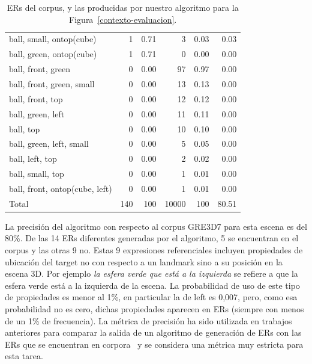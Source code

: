 \begin{table}[h]
\begin{small}
\begin{center}
\begin{tabular}{|l|r|r|r|r|r|}
ball, small, ontop(cube)                       &  1 &  0.71 &    3 &  0.03 &  0.03 \\
ball, green, ontop(cube)                       &  1 &  0.71 &    0 &  0.00 &  0.00\\
ball, front, green                              &  0 &  0.00 &   97 &  0.97 &  0.00\\
ball, front, green, small                        &  0 &  0.00 &   13 &  0.13 &  0.00\\
ball, front, top                                &  0 &  0.00 &   12 &  0.12 &  0.00\\
ball, green, left	                              &  0 &  0.00 &   11 &  0.11 &  0.00\\
ball, top                                      &  0 &  0.00 &   10 &  0.10 &  0.00\\
ball, green, left, small                         &  0 &  0.00 &    5 &  0.05 &  0.00\\
ball, left, top                                 &  0 &  0.00 &    2 &  0.02 &  0.00\\
ball, small, top                                &  0 &  0.00 &    1 &  0.01 &  0.00\\
ball, front, ontop(cube, left)                  &  0 &  0.00 &    1 &  0.01 &  0.00\\

\hline
Total & 140 & 100 & 10000 & 100 & 80.51 \\
\hline
\end{tabular}
\caption{ERs del corpus, y las producidas por nuestro algoritmo para la Figura~\protect\ref{contexto-evaluacion}.}\label{results-algo-fig3}
\vspace*{-.5cm}
\end{center}
\end{small}
\end{table}

 La precisi\'on del algoritmo con respecto al corpus GRE3D7 para esta escena es del 80\%. De las 14 ERs diferentes generadas por el algoritmo, 5 se encuentran en el corpus y las otras 9 no. Estas 9 expresiones referenciales incluyen propiedades de ubicaci\'on del target no con respecto a un landmark sino a su posici\'on en la escena 3D. Por ejemplo \emph{la esfera verde que est\'a a la izquierda} se refiere a que la esfera verde est\'a a la izquierda de la escena.  La probabilidad de uso de este tipo de propiedades es menor al 1\%, en particular la de left es 0,007, pero, como esa probabilidad no es cero, dichas propiedades aparecen en ERs (siempre con menos de un 1\% de frecuencia).  La m\'etrica de precisi\'on ha sido utilizada en trabajos anteriores para comparar la salida de un algoritmo de generaci\'on de ERs con las ERs que se encuentran en corpora~\cite{sluis07:eval,viet:gene11} y se considera una m\'etrica muy estricta para esta tarea.

